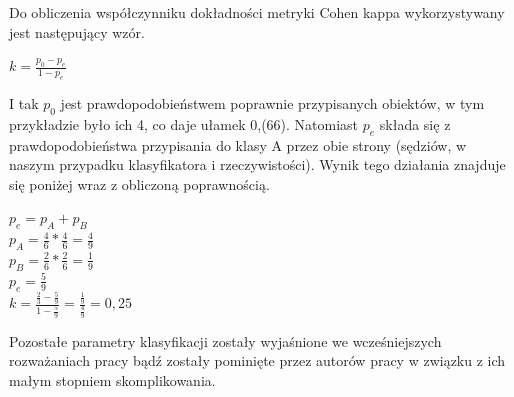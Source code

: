 \documentclass[12pt]{article}
\begin{document}
Do obliczenia współczynniku dokładności metryki Cohen kappa wykorzystywany jest następujący wzór.
\begin{center}
$ k = \frac{p_{0}-p_{e}}{1-p_{e}}$ \\
\end{center}

I tak $p_{0}$ jest prawdopodobieństwem poprawnie przypisanych obiektów, w tym przykładzie było ich 4, co daje ułamek 0,(66). Natomiast $p_{e}$ składa się z prawdopodobieństwa przypisania do klasy A przez obie strony (sędziów, w naszym przypadku klasyfikatora i rzeczywistości). Wynik tego działania znajduje się poniżej wraz z obliczoną poprawnością.
\begin{center}
$ p_{e} = p_{A} + p_{B} $ \\
$ p_{A} = \frac{4}{6} * \frac{4}{6} = \frac{4}{9}$ \\
$ p_{B} = \frac{2}{6} * \frac{2}{6} = \frac{1}{9}$ \\
$ p_{e} = \frac{5}{9} $ \\

$ k = \frac{\frac{2}{3}-\frac{5}{9}}{1 - \frac{5}{9}} = \frac{\frac{1}{9}}{\frac{4}{9}} = 0,25 $ \\
\end{center}

\indent Pozostałe parametry klasyfikacji zostały wyjaśnione we wcześniejszych rozważaniach pracy bądź zostały pominięte przez autorów pracy w związku z ich małym stopniem skomplikowania.
\newline
\end{document}

